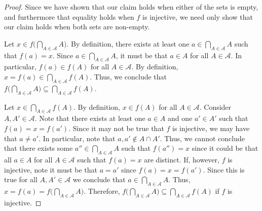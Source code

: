 \documentclass[12pt]{article}
\begin{document}
\begin{enumerate}
\begin{proof}
		Since we have shown that our claim holds when either of the sets is empty,
		and furthermore that equality holds when $f$ is injective, we need only show
		that our claim holds when both sets are non-empty.
		
		Let $x \in f\big(\bigcap_{A \in \mathcal{A}} A\big)$. By definition,
		there exists at least one $a \in \bigcap_{A \in \mathcal{A}} A$ such that
		$f(a) = x$. Since $a \in \bigcap_{A \in \mathcal{A}} A$, it must be that 
		$a \in A$ for all $A \in \mathcal{A}$. In particular, $f(a) \in f(A)$
		for all $A \in \mathcal{A}$. By definition, 
		$x = f(a) \in \bigcap_{A \in \mathcal{A}} f(A)$. Thus, we conclude that 
		$f\big(\bigcap_{A \in \mathcal{A}} A\big) \subseteq \bigcap_{A \in \mathcal{A}} f(A)$.
		
		Let $x \in \bigcap_{A \in \mathcal{A}} f(A)$. By definition, 
		$x \in f(A)$ for all $A \in \mathcal{A}$. Consider $A, A' \in \mathcal{A}$.
		Note that there exists at least one $a \in A$ and one $a' \in A'$ such that 
		$f(a) = x = f(a')$. Since it may not be true that $f$ is injective, we may 
		have that $a \neq a'$. In particular, note that $a, a' \notin A \cap A'$.
		Thus, we cannot conclude that there exists some $a'' \in \bigcap_{A \in \mathcal{A}} A$
		such that $f(a'') = x$ since it could be that all $a \in A$ for all $A \in \mathcal{A}$
		such that $f(a) = x$ are distinct. If, however, $f$ is injective, note it must 
		be that $a = a'$ since $f(a) = x = f(a')$. Since this is true for all
		$A, A' \in \mathcal{A}$ we conclude that $a \in \bigcap_{A \in \mathcal{A}} A$.
		Thus, $x = f(a) = f\big(\bigcap_{A \in \mathcal{A}} A\big)$.
		Therefore, $f\big(\bigcap_{A \in \mathcal{A}} A\big) \subseteq 
		\bigcap_{A \in \mathcal{A}} f(A)$ if $f$ is injective.
		
	\end{proof}
\end{enumerate}
\end{document}

